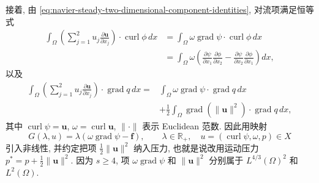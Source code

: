 接着, 由 \eqref{eq:navier-steady-two-dimensional-component-identities},
对流项满足恒等式
\begin{equation}\label{eq:navier-centered-stream-convection-curl}
\begin{aligned}
\int_\Omega\left(\sum_{j=1}^{2}u_j
\frac{\partial\boldsymbol u}{\partial x_j}\right)
\cdot\operatorname{curl}\phi\,dx
&=\int_\Omega\omega\operatorname{grad}\psi
\cdot\operatorname{curl}\phi\,dx\\
&=\int_\Omega\omega\left(
\frac{\partial\psi}{\partial x_1}
\frac{\partial\phi}{\partial x_2}
-\frac{\partial\psi}{\partial x_2}
\frac{\partial\phi}{\partial x_1}
\right)dx,
\end{aligned}
\end{equation}
以及
\begin{equation}\label{eq:navier-centered-stream-convection-gradient}
\begin{aligned}
\int_\Omega\left(\sum_{j=1}^{2}u_j
\frac{\partial\boldsymbol u}{\partial x_j}\right)
\cdot\operatorname{grad}q\,dx
={}&\int_\Omega\omega\operatorname{grad}\psi
\cdot\operatorname{grad}q\,dx\\
&+\frac12\int_\Omega
\operatorname{grad}(\|\boldsymbol u\|^2)
\cdot\operatorname{grad}q\,dx,
\end{aligned}
\end{equation}
其中 $\operatorname{curl}\psi=\boldsymbol u$,
$\omega=\operatorname{curl}\boldsymbol u$, $\|\cdot\|$ 表示 Euclidean 范数.
因此用映射
\begin{equation}\label{eq:navier-centered-stream-nonlinearity}
G(\lambda,u)=\lambda(\omega\operatorname{grad}\psi-\boldsymbol f),
\qquad
\lambda\in\mathbb R_+,
\quad
u=(\operatorname{curl}\psi,\omega,p)\in X
\end{equation}
引入非线性, 并约定把项 $\frac12\|\boldsymbol u\|^2$ 纳入压力,
也就是说改用运动压力
$p^*=p+\frac12\|\boldsymbol u\|^2$.
因为 $s\geq4$, 项 $\omega\operatorname{grad}\psi$ 和
$\|\boldsymbol u\|^2$ 分别属于 $L^{4/3}(\Omega)^2$ 和 $L^2(\Omega)$.


